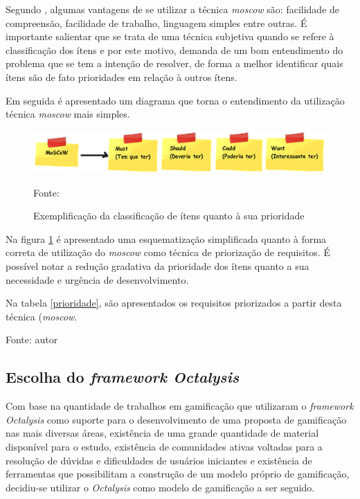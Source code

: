 Segundo , algumas vantagens de se utilizar a técnica \textit{moscow} são: facilidade de compreensão, facilidade de trabalho, linguagem simples
entre outras. É importante salientar que se trata de uma técnica subjetiva quando se refere à classificação dos ítens e por este motivo, demanda de um 
bom entendimento do problema que se tem a intenção de resolver, de forma a melhor identificar quais ítens são de fato prioridades em relação à outros ítens.

Em seguida é apresentado um diagrama que torna o entendimento da utilização técnica \textit{moscow} mais simples.

\begin{figure}[h]
	\centering
	\includegraphics[keepaspectratio=true,scale=0.75]{figuras/moscow.png}
	\caption{Exemplificação da classificação de ítens quanto à sua prioridade}
	Fonte: \cite{moscow}
	\label{moscow}
\end{figure}

Na figura \ref{moscow} é apresentado uma esquematização simplificada quanto à forma correta de utilização do \textit{moscow} como 
técnica de priorização de requisitos. É possível notar a redução gradativa da prioridade dos ítens quanto a sua necessidade
e urgência de desenvolvimento. 

Na tabela \ref{prioridade}, são apresentados os requisitos priorizados a partir desta técnica (\textit{moscow}.

\begin{table}[h]
	\centering
	\caption{Requisitos priorizados utilizando \textit{moscow}}
	\label{prioridade}
	Fonte: autor
\end{table}

\subsection{Escolha do \textit{framework Octalysis}}
Com base na quantidade de trabalhos em gamificação que utilizaram o \textit{framework Octalysis} como suporte para o desenvolvimento de 
uma proposta de gamificação nas mais diversas áreas, existência de uma grande quantidade de material disponível para o estudo, 
existência de comunidades ativas voltadas para a resolução de dúvidas e dificuldades de usuários iniciantes e existência de ferramentas 
que possibilitam a construção de um modelo próprio de gamificação, decidiu-se utilizar o \textit{Octalysis} como modelo de gamificação a
ser seguido.


